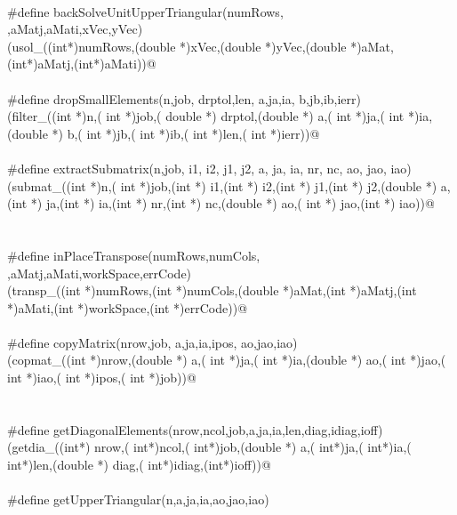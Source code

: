 \documentclass[12pt]{article}
\begin{document}
\begin{flushleft}
\begin{minipage}{\linewidth}
\begin{list}{}{}
\mbox{}\verb@@\\
\mbox{}\verb@#define backSolveUnitUpperTriangular(numRows, \@\\
\mbox{}\verb@aMat,aMatj,aMati,xVec,yVec) \@\\
\mbox{}\verb@(usol_((int*)numRows,(double *)xVec,(double *)yVec,(double *)aMat,(int*)aMatj,(int*)aMati))@\\
\mbox{}\verb@@\\
\mbox{}\verb@#define dropSmallElements(n,job, drptol,len, a,ja,ia, b,jb,ib,ierr)\@\\
\mbox{}\verb@(filter_((int *)n,( int *)job,( double *) drptol,(double *) a,( int *)ja,( int *)ia,(double *) b,( int *)jb,( int *)ib,( int *)len,( int *)ierr))@\\
\mbox{}\verb@@\\
\mbox{}\verb@#define extractSubmatrix(n,job, i1, i2, j1, j2, a, ja, ia, nr, nc, ao,  jao, iao)\@\\
\mbox{}\verb@(submat_((int *)n,( int *)job,(int *) i1,(int *) i2,(int *) j1,(int *) j2,(double *) a,(int *) ja,(int *) ia,(int *) nr,(int *) nc,(double *) ao,( int *)       jao,(int *) iao))@\\
\mbox{}\verb@@\\
\mbox{}\verb@@\\
\mbox{}\verb@#define inPlaceTranspose(numRows,numCols, \@\\
\mbox{}\verb@aMat,aMatj,aMati,workSpace,errCode) \@\\
\mbox{}\verb@(transp_((int *)numRows,(int *)numCols,(double *)aMat,(int *)aMatj,(int *)aMati,(int *)workSpace,(int *)errCode))@\\
\mbox{}\verb@@\\
\mbox{}\verb@#define copyMatrix(nrow,job, a,ja,ia,ipos, ao,jao,iao)\@\\
\mbox{}\verb@(copmat_((int *)nrow,(double *) a,( int *)ja,( int *)ia,(double *) ao,( int *)jao,( int *)iao,( int *)ipos,( int *)job))@\\
\mbox{}\verb@@\\
\mbox{}\verb@@\\
\mbox{}\verb@#define getDiagonalElements(nrow,ncol,job,a,ja,ia,len,diag,idiag,ioff)\@\\
\mbox{}\verb@(getdia_((int*) nrow,( int*)ncol,( int*)job,(double *) a,( int*)ja,( int*)ia,( int*)len,(double *) diag,( int*)idiag,(int*)ioff))@\\
\mbox{}\verb@@\\
\mbox{}\verb@#define getUpperTriangular(n,a,ja,ia,ao,jao,iao)\@\\

\end{list}
\end{minipage}
\end{flushleft}
\end{document}
